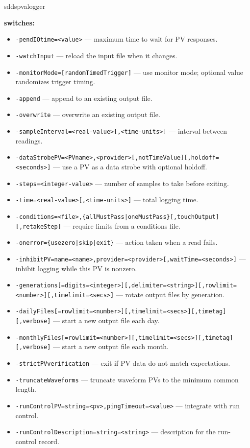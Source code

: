 \begin{sddsprog}{sddspvalogger}
\item \textbf{switches:}
\begin{itemize}
  \item {\tt -pendIOtime=<value>} --- maximum time to wait for PV responses.
  \item {\tt -watchInput} --- reload the input file when it changes.
  \item {\tt -monitorMode=[randomTimedTrigger]} --- use monitor mode; optional value randomizes trigger timing.
  \item {\tt -append} --- append to an existing output file.
  \item {\tt -overwrite} --- overwrite an existing output file.
  \item {\tt -sampleInterval=<real-value>[,<time-units>]} --- interval between readings.
  \item {\tt -dataStrobePV=<PVname>,<provider>[,notTimeValue][,holdoff=<seconds>]} --- use a PV as a data strobe with optional holdoff.
  \item {\tt -steps=<integer-value>} --- number of samples to take before exiting.
  \item {\tt -time=<real-value>[,<time-units>]} --- total logging time.
  \item {\tt -conditions=<file>,\{allMustPass|oneMustPass\}[,touchOutput][,retakeStep]} --- require limits from a conditions file.
  \item {\tt -onerror=\{usezero|skip|exit\}} --- action taken when a read fails.
  \item {\tt -inhibitPV=name=<name>,provider=<provider>[,waitTime=<seconds>]} --- inhibit logging while this PV is nonzero.
  \item {\tt -generations[=digits=<integer>][,delimiter=<string>][,rowlimit=<number>][,timelimit=<secs>]} --- rotate output files by generation.
  \item {\tt -dailyFiles[=rowlimit=<number>][,timelimit=<secs>][,timetag][,verbose]} --- start a new output file each day.
  \item {\tt -monthlyFiles[=rowlimit=<number>][,timelimit=<secs>][,timetag][,verbose]} --- start a new output file each month.
  \item {\tt -strictPVverification} --- exit if PV data do not match expectations.
  \item {\tt -truncateWaveforms} --- truncate waveform PVs to the minimum common length.
  \item {\tt -runControlPV=string=<pv>,pingTimeout=<value>} --- integrate with run control.
  \item {\tt -runControlDescription=string=<string>} --- description for the run-control record.

\end{itemize}
\end{sddsprog}
